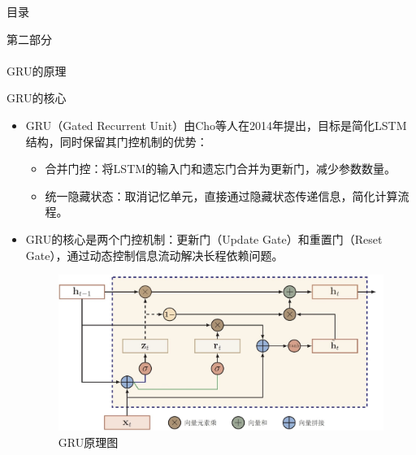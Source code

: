 
\begin{frame}{目录}
        \begin{center}
            \textcolor{NJU_purple}{\Large 第二部分} \\
            \text{\;} \\
            \textcolor{NJU_purple}{\Huge GRU的原理} 
        \end{center}      
    \end{frame}

\begin{frame}{GRU的核心} 
    \begin{itemize}
        \item GRU（Gated Recurrent Unit）由Cho等人在2014年提出，目标是简化LSTM结构，同时保留其门控机制的优势：
        \begin{itemize}
            \item 合并门控：将LSTM的输入门和遗忘门合并为更新门，减少参数数量。
            \item 统一隐藏状态：取消记忆单元，直接通过隐藏状态传递信息，简化计算流程。
        \end{itemize}
        \item GRU的核心是两个门控机制：更新门（Update Gate）和重置门（Reset Gate），通过动态控制信息流动解决长程依赖问题。
        \begin{figure}
            \centering
            \includegraphics[width=0.55\linewidth]{pic/GRU原理图.png}
            \caption{GRU原理图}
            \label{fig:GRU}
        \end{figure}
    \end{itemize}
\end{frame}

